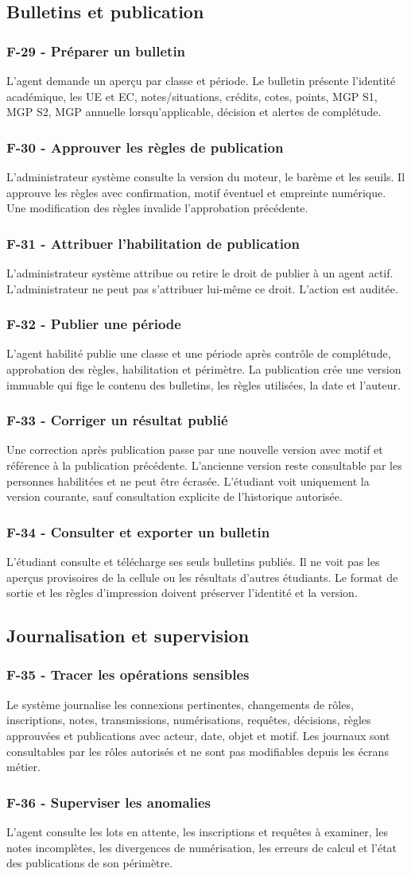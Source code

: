 \documentclass[11pt,a4paper]{article}
\newcommand{\req}[3]{\subsubsection*{#1 - #2}\noindent #3\par\medskip}
\begin{document}
\subsection{Bulletins et publication}
\req{F-29}{Préparer un bulletin}{L'agent demande un aperçu par classe et période. Le bulletin présente l'identité académique, les UE et EC, notes/situations, crédits, cotes, points, MGP S1, MGP S2, MGP annuelle lorsqu'applicable, décision et alertes de complétude.}
\req{F-30}{Approuver les règles de publication}{L'administrateur système consulte la version du moteur, le barème et les seuils. Il approuve les règles avec confirmation, motif éventuel et empreinte numérique. Une modification des règles invalide l'approbation précédente.}
\req{F-31}{Attribuer l'habilitation de publication}{L'administrateur système attribue ou retire le droit de publier à un agent actif. L'administrateur ne peut pas s'attribuer lui-même ce droit. L'action est auditée.}
\req{F-32}{Publier une période}{L'agent habilité publie une classe et une période après contrôle de complétude, approbation des règles, habilitation et périmètre. La publication crée une version immuable qui fige le contenu des bulletins, les règles utilisées, la date et l'auteur.}
\req{F-33}{Corriger un résultat publié}{Une correction après publication passe par une nouvelle version avec motif et référence à la publication précédente. L'ancienne version reste consultable par les personnes habilitées et ne peut être écrasée. L'étudiant voit uniquement la version courante, sauf consultation explicite de l'historique autorisée.}
\req{F-34}{Consulter et exporter un bulletin}{L'étudiant consulte et télécharge ses seuls bulletins publiés. Il ne voit pas les aperçus provisoires de la cellule ou les résultats d'autres étudiants. Le format de sortie et les règles d'impression doivent préserver l'identité et la version.}

\subsection{Journalisation et supervision}
\req{F-35}{Tracer les opérations sensibles}{Le système journalise les connexions pertinentes, changements de rôles, inscriptions, notes, transmissions, numérisations, requêtes, décisions, règles approuvées et publications avec acteur, date, objet et motif. Les journaux sont consultables par les rôles autorisés et ne sont pas modifiables depuis les écrans métier.}
\req{F-36}{Superviser les anomalies}{L'agent consulte les lots en attente, les inscriptions et requêtes à examiner, les notes incomplètes, les divergences de numérisation, les erreurs de calcul et l'état des publications de son périmètre.}
\end{document}
